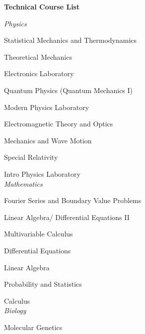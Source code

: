 \documentclass[9pt]{article}
\begin{document}
\newpage

%
%

\noindent
{\bf Technical Course List \\}
\vspace{-7mm}

\begin{multicols}{2}
\noindent
{\it Physics} \\
\setlength{\parindent}{5mm}
\setlength{\parskip}{-5.5mm}
\par Statistical Mechanics and Thermodynamics \\
\par Theoretical Mechanics \\
\par Electronics Laboratory \\
\par Quantum Physics (Quantum Mechanics I) \\
\par Modern Physics Laboratory \\
\par Electromagnetic Theory and Optics \\
\par Mechanics and Wave Motion \\
\par Special Relativity \\
\par Intro Physics Laboratory \\

\vspace{3mm}
\noindent
{\it Mathematics} \\
\par Fourier Series and Boundary Value Problems \\
\par Linear Algebra/ Differential Equations II \\
\par Multivariable Calculus \\
\par Differential Equations \\
\par Linear Algebra \\
\par Probability and Statistics \\
\par Calculus \\

\vspace{3mm}
\noindent
{\it Biology} \\
\par Molecular Genetics \\


\end{multicols}
\end{document}
